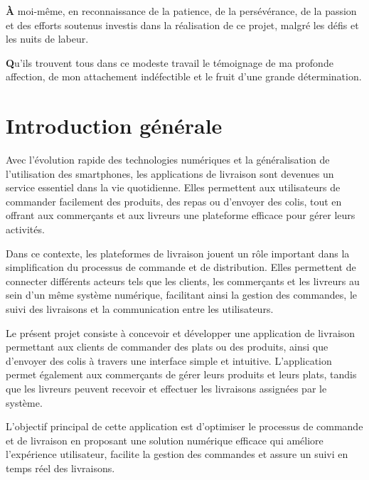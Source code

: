 \documentclass[12pt,fleqn,a4paper]{report}
\begin{document}
\begin{justify}
\begin{center}
  \vspace{0.7cm}

  \noindent \textbf{À} moi-même, en reconnaissance de la patience, de la persévérance, de la passion et des efforts soutenus investis dans la réalisation de ce projet, malgré les défis et les nuits de labeur.

  \vspace{1.1cm}

  \noindent \textbf{Q}u'ils trouvent tous dans ce modeste travail le témoignage de ma profonde affection, de mon attachement indéfectible et le fruit d'une grande détermination.
\end{center}

\newpage

\newpage
\chapter*{\hfill Introduction générale \hfill}

\renewcommand{\thepage}{\arabic{page}}
\setcounter{page}{1}

Avec l'évolution rapide des technologies numériques et la généralisation de l'utilisation des smartphones, les applications de livraison sont devenues un service essentiel dans la vie quotidienne. Elles permettent aux utilisateurs de commander facilement des produits, des repas ou d'envoyer des colis, tout en offrant aux commerçants et aux livreurs une plateforme efficace pour gérer leurs activités.

Dans ce contexte, les plateformes de livraison jouent un rôle important dans la simplification du processus de commande et de distribution. Elles permettent de connecter différents acteurs tels que les clients, les commerçants et les livreurs au sein d'un même système numérique, facilitant ainsi la gestion des commandes, le suivi des livraisons et la communication entre les utilisateurs.

Le présent projet consiste à concevoir et développer une application de livraison permettant aux clients de commander des plats ou des produits, ainsi que d'envoyer des colis à travers une interface simple et intuitive. L'application permet également aux commerçants de gérer leurs produits et leurs plats, tandis que les livreurs peuvent recevoir et effectuer les livraisons assignées par le système.

L'objectif principal de cette application est d'optimiser le processus de commande et de livraison en proposant une solution numérique efficace qui améliore l'expérience utilisateur, facilite la gestion des commandes et assure un suivi en temps réel des livraisons.


\end{justify}
\end{document}
